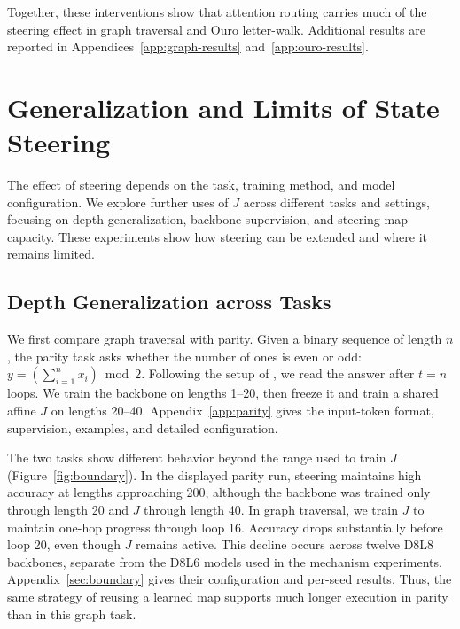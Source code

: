 \documentclass{article}
\begin{document}
Together, these interventions show that attention routing carries much of the steering effect in graph traversal and Ouro letter-walk. Additional results are reported in Appendices~\ref{app:graph-results} and~\ref{app:ouro-results}.

\section{Generalization and Limits of State Steering}
\label{sec:generalization}
The effect of steering depends on the task, training method, and model configuration. We explore further uses of $J$ across different tasks and settings, focusing on depth generalization, backbone supervision, and steering-map capacity. These experiments show how steering can be extended and where it remains limited.

\subsection{Depth Generalization across Tasks}
\label{sec:depth-boundary}\label{sec:parity}
We first compare graph traversal with parity. Given a binary sequence of length $n$, the parity task asks whether the number of ones is even or odd: $y=(\sum_{i=1}^{n}x_i)\bmod 2$. Following the setup of \citet{fan2025looped}, we read the answer after $t=n$ loops. We train the backbone on lengths 1--20, then freeze it and train a shared affine $J$ on lengths 20--40. Appendix~\ref{app:parity} gives the input-token format, supervision, examples, and detailed configuration.

The two tasks show different behavior beyond the range used to train $J$ (Figure~\ref{fig:boundary}). In the displayed parity run, steering maintains high accuracy at lengths approaching 200, although the backbone was trained only through length 20 and $J$ through length 40. In graph traversal, we train $J$ to maintain one-hop progress through loop 16. Accuracy drops substantially before loop 20, even though $J$ remains active. This decline occurs across twelve D8L8 backbones, separate from the D8L6 models used in the mechanism experiments. Appendix~\ref{sec:boundary} gives their configuration and per-seed results. Thus, the same strategy of reusing a learned map supports much longer execution in parity than in this graph task.
\end{document}
